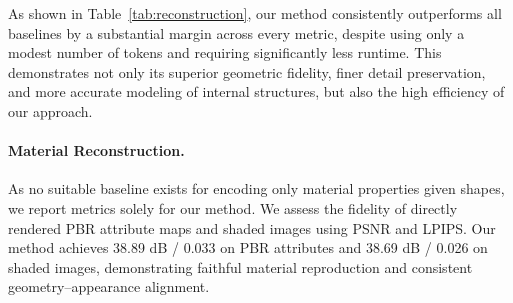 \documentclass[10pt,twocolumn,letterpaper]{article}
\newcommand{\paravspace}{\vspace{-11pt}}
\begin{document}
As shown in Table~\ref{tab:reconstruction}, our method consistently outperforms all baselines by a substantial margin across every metric, despite using only a modest number of tokens and requiring significantly less runtime. This demonstrates not only its superior geometric fidelity, finer detail preservation, and more accurate modeling of internal structures, but also the high efficiency of our approach.

\paravspace
\paragraph{Material Reconstruction.}
As no suitable baseline exists for encoding only material properties given shapes, we report metrics solely for our method. We assess the fidelity of directly rendered PBR attribute maps and shaded images using PSNR and LPIPS. Our method achieves 38.89 dB / 0.033 on PBR attributes and 38.69 dB / 0.026 on shaded images, demonstrating faithful material reproduction and consistent geometry–appearance alignment.
\end{document}

